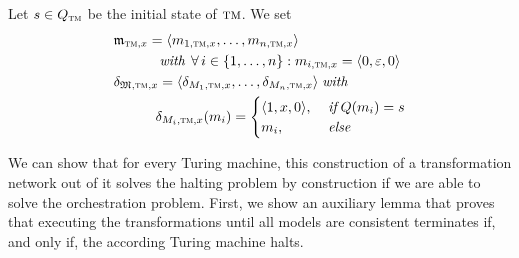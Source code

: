 Let $s \in Q_{\textsc{tm}}$ be the initial state of $\textsc{tm}$. We set
\begin{align*}
    &
    \modeltuple{m}_{\TuringMachine, x} = \tupled{\model{m}{1,\TuringMachine,x}, \dots, \model{m}{n,\TuringMachine,x}} \\
    & \formulaskip\formulaskip\formulaskip
    \mathtext{with} \forall i \in \setted{1, \dots, n} : %
    \model{m}{i, \TuringMachine, x} = \tupled{0, \varepsilon, 0} \\
    &
    \changetuple{\metamodeltuple{M},\TuringMachine,x} = \tupled{\change{\metamodel{M}{1},\TuringMachine,x}, \dots, \change{\metamodel{M}{n},\TuringMachine,x}} \mathtext{with} \\
    &
    \formulaskip\formulaskip\formulaskip
    \change{\metamodel{M}{i},\TuringMachine,x}(\model{m}{i}) = 
    \begin{cases}
        \tupled{1,x,0}, & \mathtext{if} Q(\model{m}{i}) = s\\
        \model{m}{i}, & \mathtext{else}
    \end{cases}
\end{align*}

We can show that for every Turing machine, this construction of a transformation network out of it solves the halting problem by construction if we are able to solve the orchestration problem.
First, we show an auxiliary lemma that proves that executing the transformations until all models are consistent terminates if, and only if, the according Turing machine halts.


